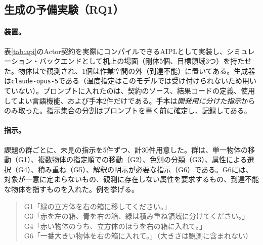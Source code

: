 \documentclass[10pt,letterpaper]{article}
\begin{document}
\subsection{生成の予備実験（RQ1）}\label{sec:rq1}
\paragraph{装置。}表\ref{tab:api}のActor契約を実際にコンパイルできるAIPLとして実装し、シミュレーション・バックエンドとして机上の場面（剛体5個、目標領域3つ）を持たせた。物体は{\codefont [id, 色, 形, x, z]}で観測され、1個は作業空間の外（到達不能）に置いてある。生成器は\texttt{claude-opus-5}である（温度指定はこのモデルでは受け付けられないため用いていない）。プロンプトに入れたのは、契約のソース、結果コードの定義、使用してよい言語機能、および手本2件だけである。手本は\emph{開発用に分けた指示}からのみ取った。指示集合の分割はプロンプトを書く前に確定し、記録してある。

\paragraph{指示。}課題の群ごとに、未見の指示を5件ずつ、計30件用意した。群は、単一物体の移動（G1）、複数物体の指定順での移動（G2）、色別の分類（G3）、属性による選択（G4）、積み重ね（G5）、解釈の明示が必要な指示（G6）である。G6には、対象が一意に定まらないもの、観測に存在しない属性を要求するもの、到達不能な物体を指すものを入れた。例を挙げる。

\begin{quote}\small
G1「緑の立方体を右の箱に移してください。」\\
G3「赤を左の箱、青を右の箱、緑は積み重ね領域に分けてください。」\\
G4「赤い物体のうち、立方体のほうを右の箱に入れて。」\\
G6「一番大きい物体を右の箱に入れて。」（大きさは観測に含まれない）
\end{quote}
\end{document}
